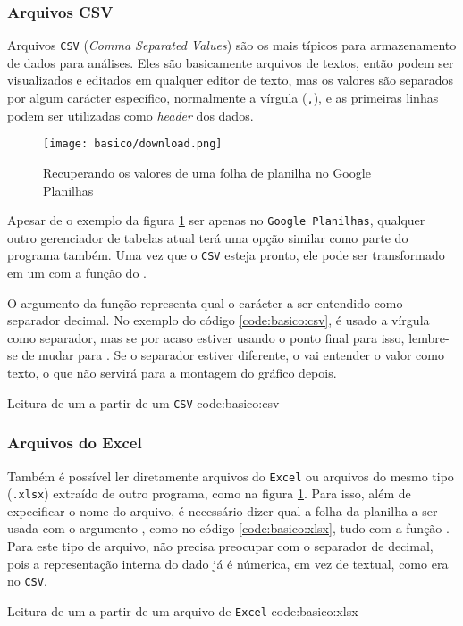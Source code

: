     \subsubsection{Arquivos CSV}

        Arquivos \texttt{CSV} (\textit{Comma Separated Values}) são os mais típicos para armazenamento de dados para análises. Eles são basicamente arquivos de textos, então podem ser visualizados e editados em qualquer editor de texto, mas os valores são separados por algum carácter específico, normalmente a vírgula (\texttt{,}), e as primeiras linhas podem ser utilizadas como \textit{header} dos dados.

        \begin{figure}[H]
            \centering
            \texttt{[image: basico/download.png]}

            \caption{Recuperando os valores de uma folha de planilha no Google Planilhas}
            \label{fig:basico:download}
        \end{figure}

        Apesar de o exemplo da figura \ref{fig:basico:download} ser apenas no \texttt{Google Planilhas}, qualquer outro gerenciador de tabelas atual terá uma opção similar como parte do programa também. Uma vez que o \texttt{CSV} esteja pronto, ele pode ser transformado em um \dataframe com a função \href{http://pandas.pydata.org/pandas-docs/stable/reference/api/pandas.read_csv.html#pandas.read_csv}{} do \pandas.

        O argumento  da função representa qual o carácter a ser entendido como separador decimal. No exemplo do código \ref{code:basico:csv}, é usado a vírgula como separador, mas se por acaso estiver usando o ponto final para isso, lembre-se de mudar para . Se o separador estiver diferente, o \pandas vai entender o valor como texto, o que não servirá para a montagem do gráfico depois.

        {Leitura de um \dataframe a partir de um \texttt{CSV}}
        {code:basico:csv}

    \subsubsection{Arquivos do Excel}

        Também é possível ler diretamente arquivos do \texttt{Excel} ou arquivos do mesmo tipo (\texttt{.xlsx}) extraído de outro programa, como na figura \ref{fig:basico:download}. Para isso, além de expecificar o nome do arquivo, é necessário dizer qual a folha da planilha a ser usada com o argumento , como no código \ref{code:basico:xlsx}, tudo com a função \href{http://pandas.pydata.org/pandas-docs/stable/reference/api/pandas.read_excel.html#pandas.read_excel}{}. Para este tipo de arquivo, não precisa preocupar com o separador de decimal, pois a representação interna do dado já é númerica, em vez de textual, como era no \texttt{CSV}.

        {Leitura de um \dataframe a partir de um arquivo de \texttt{Excel}}
        {code:basico:xlsx}

